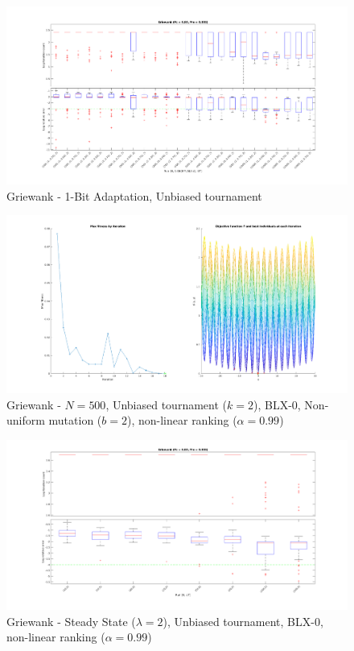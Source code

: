 \documentclass[12pt, letterpaper]{article}
\begin{document}
\begin{figure}
  \includegraphics[width=\linewidth]{img/g_1b_ut.png}
  \centering
  \captionsetup{justification=centering}
  \caption{Griewank - 1-Bit Adaptation, Unbiased tournament}
  \label{fig:g_1b_ut}
\end{figure}
 
\begin{figure}
  \includegraphics[width=\linewidth]{img/g_quick.png}
  \centering
  \captionsetup{justification=centering}
  \caption{Griewank - $N = 500$, Unbiased tournament ($k = 2$), BLX-0, Non-uniform mutation ($b = 2$), non-linear ranking ($\alpha = 0.99$)}
  \label{fig:g_quick}
\end{figure}

\begin{figure}
  \includegraphics[width=\linewidth]{img/g_ss_test.png}
  \centering
  \captionsetup{justification=centering}
  \caption{Griewank - Steady State ($\lambda = 2$), Unbiased tournament, BLX-0, non-linear ranking ($\alpha = 0.99$)}
  \label{fig:g_ss_test}
\end{figure}
\end{document}
